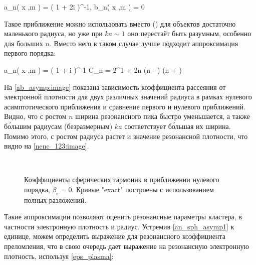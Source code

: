     \eq
        a_n\left( x ,\:m \right) = \left( 1 + 2i    \right)^{-1}, \qquad b_n\left( x ,\:m \right) = 0
        \label{ab_asymp}
    \qe

Такое приближение можно использовать вместо () для объектов достаточно маленького радиуса, но уже при $ka \sim 1$ оно перестаёт быть разумным, особенно для больших $n$. Вместо него в таком случае лучше подходит аппроксимация первого порядка:

    \eq
		a_n\left( x ,\:m \right) = \left( 1 + i  \right)^{-1}
		\label{an_sph_asymp1}
	\qe
	\eqc
		C_n = 2^{1 + 2n} \Gamma(n - ) \Gamma(n + )
	\cqe

На \autoref{ab_asymp:image} показана зависимость коэффициента рассеяния от электронной плотности для двух различных значений радиуса в рамках нулевого асимптотического приближения и сравнение первого и нулевого приближений. Видно, что с ростом $n$ ширина резонансного пика быстро уменьшается, а также б\'{о}льшим радиусам (безразмерным) $ka$ соответствует б\'{о}льшая их ширина. Помимо этого, с ростом радиуса растет и значение резонансной плотности, что видно на \autoref{nenc_123:image}.

    \begin{figure}[H]
        \\
		\caption{Коэффициенты сферических гармоник в приближении нулевого порядка, $\beta_e = 0$. Кривые "exact" построены с использованием полных разложений.}
		\label{ab_asymp:image}
	\end{figure}


Такие аппроксимации позволяют оценить резонансные параметры кластера, в частности электронную плотность и радиус. Устремив \autoref{an_sph_asymp1} к единице, можем определить выражение для резонансного коэффициента преломления, что в свою очередь дает выражение на резонансную электронную плотность, используя \autoref{eps_plasma}:

